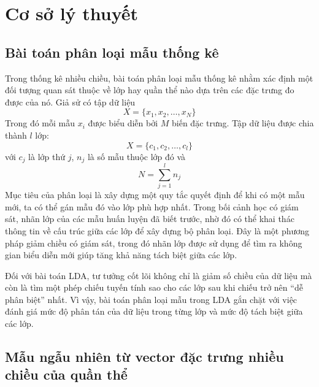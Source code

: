 \chapter {Cơ sở lý thuyết}

\setlength{\parindent}{0pt}

\section{Bài toán phân loại mẫu thống kê}

Trong thống kê nhiều chiều, bài toán phân loại mẫu thống kê nhằm xác định một đối tượng quan sát thuộc về lớp hay quần thể nào dựa trên các đặc trưng đo được của nó. Giả sử có tập dữ liệu
\[
X = \{x_1, x_2, \ldots, x_N\}
\]
Trong đó mỗi mẫu $x_i$ được biểu diễn bởi $M$ biến đặc trưng. Tập dữ liệu được chia thành $l$ lớp:
\[
X = \{c_1, c_2, \ldots, c_l\}
\]
với $c_j$ là lớp thứ $j$, $n_j$ là số mẫu thuộc lớp đó và
\[
N = \sum_{j=1}^{l} n_j
\]
Mục tiêu của phân loại là xây dựng một quy tắc quyết định để khi có một mẫu mới, ta có thể gán mẫu đó vào lớp phù hợp nhất. Trong bối cảnh học có giám sát, nhãn lớp của các mẫu huấn luyện đã biết trước, nhờ đó có thể khai thác thông tin về cấu trúc giữa các lớp để xây dựng bộ phân loại. Đây là một phương pháp giảm chiều có giám sát, trong đó nhãn lớp được sử dụng để tìm ra không gian biểu diễn mới giúp tăng khả năng tách biệt giữa các lớp.

Đối với bài toán LDA, tư tưởng cốt lõi không chỉ là giảm số chiều của dữ liệu mà còn là tìm một phép chiếu tuyến tính sao cho các lớp sau khi chiếu trở nên “dễ phân biệt” nhất. Vì vậy, bài toán phân loại mẫu trong LDA gắn chặt với việc đánh giá mức độ phân tán của dữ liệu trong từng lớp và mức độ tách biệt giữa các lớp.

\section{Mẫu ngẫu nhiên từ vector đặc trưng nhiều chiều của quần thể}

